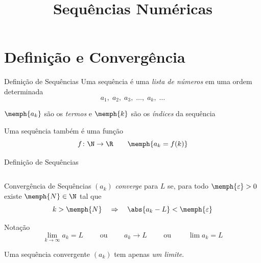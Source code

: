 
\usepackage{integracao_e_series}

\title{Sequências Numéricas}



\addtitle

\section{Definição e Convergência}

\begin{frame}{Definição de Sequências}
    Uma sequência é uma \emph{lista de números} em uma ordem determinada
    \[a_1,\;a_2,\;a_3,\; \dots,\; a_k,\; \dots\]

    \pause
    $\memph{a_k}$ são os \emph{termos}
    \pause
    \;e\; $\memph{k}$ são os \emph{índices} da sequência

    \pause
    \vspace{\baselineskip}
    Uma sequência também é uma função
    \[f\colon\N\to\R \qquad \memph{a_k = f(k)}\]
\end{frame}

\begin{frame}{Definição de Sequências}
\begin{columns}
  \centerline{\scalebox{0.9}{}}  \pause
  \centerline{\scalebox{0.9}{}}
\end{columns}
\end{frame}

\begin{frame}{Convergência de Sequências}
    $(a_k)$ \emph{converge} para $L$ se, para todo $\memph{\varepsilon}>0$
    existe $\memph{N}\in \N$ tal que
    \[
    	k>\memph{N} \quad \Rightarrow  \quad \abs{a_k-L}<\memph{\varepsilon}
    \]

    \pause
    \vspace{\baselineskip}
    Notação
    \[
      \lim_{k\to \infty} a_k = L \qquad\text{ ou }\qquad
      a_k \to L                  \qquad\text{ ou }\qquad
      \lim a_k = L
    \]

    \pause
    \vspace{\baselineskip}
    Uma sequência convergente $(a_k)$ tem apenas \emph{um limite}.
\end{frame}

